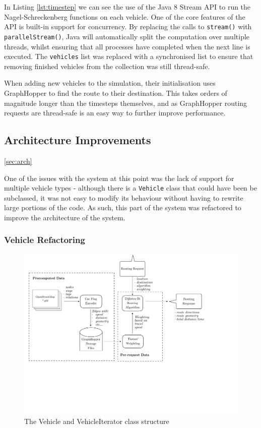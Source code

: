 \documentclass[ %
                    author={Alexander Hill},
                supervisor={Dr. Benjamin Sach},
                    degree={MEng},
                     title={MARMOSET},
                  subtitle={Multi-Agent Route Management using Online Simulation for Efficient Transportation},
                      type={research},
                      year={2016} ]{dissertation}
\begin{document}
In Listing \ref{lst:timestep} we can see the use of the Java 8 Stream API to run
the Nagel-Schreckenberg functions on each vehicle. One of the core features of
the API is built-in support for concurrency. By replacing the calls to
\texttt{stream()} with \texttt{parallelStream()}, Java will automatically split
the computation over multiple threads, whilst ensuring that all processes have
completed when the next line is executed. The \texttt{vehicles} list was
replaced with a synchronised list to ensure that removing finished vehicles from
the collection was still thread-safe.

When adding new vehicles to the simulation, their initialisation uses
GraphHopper to find the route to their destination. This takes orders of
magnitude longer than the timesteps themselves, and as GraphHopper routing
requests are thread-safe is an easy way to further improve performance.

\subsection{Architecture Improvements}\ref{sec:arch}

One of the issues with the system at this point was the lack of support for
multiple vehicle types - although there is a \texttt{Vehicle} class that could
have been be subclassed, it was not easy to modify its behaviour without having
to rewrite large portions of the code.  As such, this part of the system was
refactored to improve the architecture of the system.

\subsubsection{Vehicle Refactoring}

\begin{figure}[h]
    \centering
    \includegraphics[scale=0.6,page=6,clip,trim=0 11cm 8cm 0]{architecture}
    \caption{The Vehicle and VehicleIterator class structure}\label{fig:veh-arch}
\end{figure}
\end{document}
